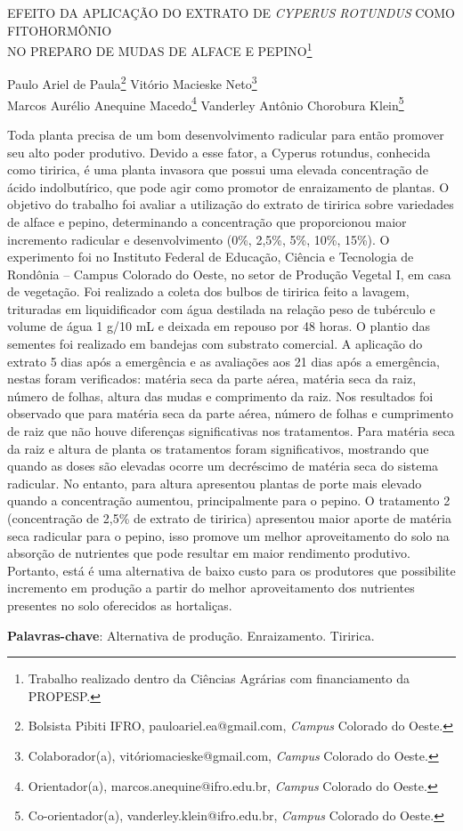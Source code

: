 \documentclass[article,12pt,onesidea,4paper,english,brazil]{abntex2}
\begin{document}
	
	
	\frenchspacing 
	
	\begin{center}
		\LARGE EFEITO DA APLICAÇÃO DO EXTRATO DE \textit{CYPERUS ROTUNDUS} COMO
		FITOHORMÔNIO\\NO PREPARO DE MUDAS DE ALFACE E PEPINO\footnote{Trabalho realizado dentro da Ciências Agrárias com financiamento da PROPESP.}
		
		\normalsize
		Paulo Ariel de Paula\footnote{Bolsista Pibiti IFRO, pauloariel.ea@gmail.com, \textit{Campus} Colorado do Oeste.} 
		Vitório Macieske Neto\footnote{Colaborador(a), vitóriomacieske@gmail.com, \textit{Campus} Colorado do Oeste.} \\
		Marcos Aurélio Anequine Macedo\footnote{Orientador(a), marcos.anequine@ifro.edu.br, \textit{Campus} Colorado do Oeste.} 
		Vanderley Antônio Chorobura Klein\footnote{Co-orientador(a), vanderley.klein@ifro.edu.br, \textit{Campus} Colorado do Oeste.} 
	\end{center}
	
	\noindent Toda planta precisa de um bom desenvolvimento radicular para então promover seu
	alto poder produtivo. Devido a esse fator, a Cyperus rotundus, conhecida como
	tiririca, é uma planta invasora que possui uma elevada concentração de ácido
	indolbutírico, que pode agir como promotor de enraizamento de plantas. O objetivo
	do trabalho foi avaliar a utilização do extrato de tiririca sobre variedades de alface e
	pepino, determinando a concentração que proporcionou maior incremento radicular
	e desenvolvimento (0\%, 2,5\%, 5\%, 10\%, 15\%). O experimento foi no Instituto
	Federal de Educação, Ciência e Tecnologia de Rondônia – Campus Colorado do
	Oeste, no setor de Produção Vegetal I, em casa de vegetação. Foi realizado a coleta
	dos bulbos de tiririca feito a lavagem, trituradas em liquidificador com água destilada
	na relação peso de tubérculo e volume de água 1 g/10 mL e deixada em repouso por
	48 horas. O plantio das sementes foi realizado em bandejas com substrato
	comercial. A aplicação do extrato 5 dias após a emergência e as avaliações aos 21
	dias após a emergência, nestas foram verificados: matéria seca da parte aérea,
	matéria seca da raiz, número de folhas, altura das mudas e comprimento da raiz.
	Nos resultados foi observado que para matéria seca da parte aérea, número de
	folhas e cumprimento de raiz que não houve diferenças significativas nos
	tratamentos. Para matéria seca da raiz e altura de planta os tratamentos foram
	significativos, mostrando que quando as doses são elevadas ocorre um decréscimo
	de matéria seca do sistema radicular. No entanto, para altura apresentou plantas de
	porte mais elevado quando a concentração aumentou, principalmente para o pepino.
	O tratamento 2 (concentração de 2,5\% de extrato de tiririca) apresentou maior
	aporte de matéria seca radicular para o pepino, isso promove um melhor
	aproveitamento do solo na absorção de nutrientes que pode resultar em maior
	rendimento produtivo. Portanto, está é uma alternativa de baixo custo para os
	produtores que possibilite incremento em produção a partir do melhor
	aproveitamento dos nutrientes presentes no solo oferecidos as hortaliças.
	
	\vspace{\onelineskip}
	
	\noindent
	\textbf{Palavras-chave}: Alternativa de produção. Enraizamento. Tiririca.
	
\end{document}
